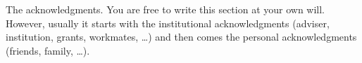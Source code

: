 \acknowledgements

The acknowledgments. You are free to write this section at your own will.  However, usually it starts with the institutional acknowledgments (adviser, institution, grants, workmates, \ldots) and then comes the personal acknowledgments (friends, family, \ldots).

